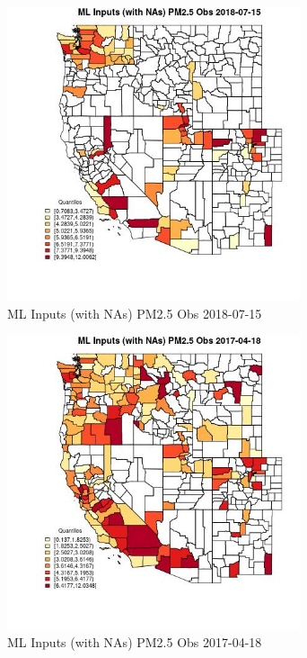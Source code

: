 \begin{figure} 
\centering  
\includegraphics[width=0.77\textwidth]{Code_Outputs/Report_ML_input_PM25_Step4_part_e_de_duplicated_aveswNAs_CountyPM25_ObsMean2018-07-15_2018-07-15.jpg} 
\caption{\label{fig:Report_ML_input_PM25_Step4_part_e_de_duplicated_aveswNAsCountyPM25_ObsMean2018-07-15_2018-07-15}ML Inputs (with NAs) PM2.5 Obs 2018-07-15} 
\end{figure} 
 

\begin{figure} 
\centering  
\includegraphics[width=0.77\textwidth]{Code_Outputs/Report_ML_input_PM25_Step4_part_e_de_duplicated_aveswNAs_CountyPM25_ObsMean2017-04-18_2017-04-18.jpg} 
\caption{\label{fig:Report_ML_input_PM25_Step4_part_e_de_duplicated_aveswNAsCountyPM25_ObsMean2017-04-18_2017-04-18}ML Inputs (with NAs) PM2.5 Obs 2017-04-18} 
\end{figure} 
 

